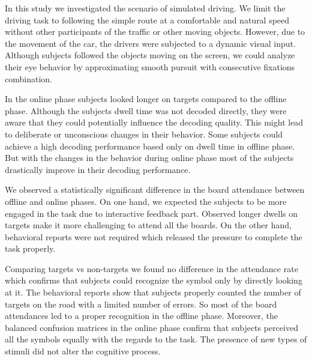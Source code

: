 \documentclass[12pt]{iopart}
\begin{document}
In this study we investigated the scenario of simulated driving.
We limit the driving task to following the simple route at a comfortable and natural speed
without other participants of the traffic or other moving objects.
However, due to the movement of the car, the drivers
were subjected to a dynamic visual input. Although subjects followed
the objects moving on the screen,
we could analyze their eye behavior by approximating smooth pursuit
with consecutive fixations combination.

In the online phase subjects looked longer on targets compared to the offline phase.
Although the subjects dwell time was not decoded directly, they were aware
that they could potentially influence the decoding quality. This might
lead to deliberate or unconscious changes in their behavior.
Some subjects could achieve a high decoding performance based
only on dwell time in offline phase. But with the changes in the behavior
during online phase most of the subjects drastically improve in their decoding performance.

We observed a statistically significant difference in the board attendance
between offline and online phases. On one hand, we expected the subjects to 
be more engaged in the task due to interactive feedback part.
Observed longer dwells on targets make it more challenging to attend
all the boards.
On the other hand, behavioral reports were not required which released
the pressure to complete the task properly.

Comparing targets vs non-targets we found no difference in the attendance rate
which confirms that subjects could recognize the symbol only by directly looking at it.
The behavioral reports show that subjects properly counted the number
of targets on the road with a limited number of errors.
So most of the board attendances led to a proper recognition in the offline phase.
Moreover, the balanced confusion matrices in the online phase
confirm that subjects perceived all the symbols equally with the regards
to the task. The presence of new types of stimuli did not alter
the cognitive process.
\end{document}
